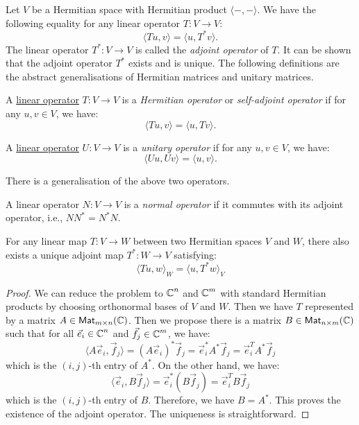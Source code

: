 Let $V$ be a Hermitian space with Hermitian product $\langle -, - \rangle$. We have the following equality for any linear operator $T : V \to V$:
\[
	\langle Tu, v \rangle = \langle u, T^* v \rangle.
\]
The linear operator $T^* : V \to V$ is called the \emph{adjoint operator} of $T$. It can be shown that the adjoint operator $T^*$ exists and is unique. The following definitions are the abstract generalisations of Hermitian matrices and unitary matrices.

\begin{definition}\label{def:hermitian_operator}
	A \hyperref[def:linear_operator]{linear operator} $T : V \to V$ is a \emph{Hermitian operator} or \emph{self-adjoint operator} if for any $u, v \in V$, we have:
	\[
		\langle Tu, v \rangle = \langle u, Tv \rangle.
	\]
\end{definition}
\begin{definition}\label{def:unitary_operator}
	A \hyperref[def:linear_operator]{linear operator} $U : V \to V$ is a \emph{unitary operator} if for any $u, v \in V$, we have:
	\[
		\langle Uu, Uv \rangle = \langle u, v \rangle.
	\]
\end{definition}

There is a generalisation of the above two operators.

\begin{definition}\label{def:normal_operator}
	A linear operator $N : V \to V$ is a \emph{normal operator} if it commutes with its adjoint operator, i.e., $N N^* = N^* N$.
\end{definition}

\begin{proposition}
	For any linear map $T : V \to W$ between two Hermitian spaces $V$ and $W$, there also exists a unique adjoint map $T^* : W \to V$ satisfying:
	\[
		\langle Tu, w \rangle_W = \langle u, T^* w \rangle_V
	\]
\end{proposition}
\begin{proof}
	We can reduce the problem to $\operatorname{\mathbb{C}}^n$ and $\operatorname{\mathbb{C}}^m$ with standard Hermitian products by choosing orthonormal bases of $V$ and $W$. Then we have $T$ represented by a matrix $A \in \operatorname{\text{\normalfont\sffamily Mat}}_{m \times n}(\operatorname{\mathbb{C}})$. Then we propose there is a matrix $B \in \operatorname{\text{\normalfont\sffamily Mat}}_{n \times m}(\operatorname{\mathbb{C}})$ such that for all $\vec{e}_i \in \operatorname{\mathbb{C}}^n$ and $\vec{f}_j \in \operatorname{\mathbb{C}}^m$, we have:
	\[
		\langle A\vec{e}_i, \vec{f}_j \rangle = {(A\vec{e}_i)}^* \vec{f}_j = \vec{e}_i^* A^* \vec{f}_j = \vec{e}_i^T A^* \vec{f}_j
	\]
	which is the $(i, j)$-th entry of $A^*$. On the other hand, we have:
	\[
		\langle \vec{e}_i, B\vec{f}_j \rangle = \vec{e}_i^* (B\vec{f}_j) = \vec{e}_i^T B \vec{f}_j
	\]
	which is the $(i, j)$-th entry of $B$. Therefore, we have $B = A^*$. This proves the existence of the adjoint operator. The uniqueness is straightforward.
\end{proof}

